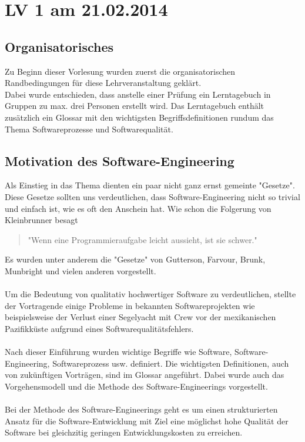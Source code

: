 \chapter{LV 1 am 21.02.2014}
\section{Organisatorisches}
Zu Beginn dieser Vorlesung wurden zuerst die organisatorischen Randbedingungen für diese Lehrveranstaltung geklärt.\\
Dabei wurde entschieden, dass anstelle einer Prüfung ein Lerntagebuch in Gruppen zu max. drei Personen erstellt wird. Das Lerntagebuch enthält zusätzlich ein Glossar mit den wichtigsten Begriffsdefinitionen rundum das Thema Softwareprozesse und Softwarequalität.

\section{Motivation des Software-Engineering}
Als Einstieg in das Thema dienten ein paar nicht ganz ernst gemeinte "Gesetze". Diese Gesetze sollten uns verdeutlichen, dass Software-Engineering nicht so trivial und einfach ist, wie es oft den Anschein hat. Wie schon die Folgerung von Kleinbrunner besagt
\begin{quote}
"Wenn eine Programmieraufgabe leicht aussieht, ist sie schwer."
\end{quote}
Es wurden unter anderem die "Gesetze" von Gutterson, Farvour, Brunk, Munbright und vielen anderen vorgestellt.
\\\\
Um die Bedeutung von qualitativ hochwertiger Software zu verdeutlichen, stellte der Vortragende einige Probleme in bekannten Softwareprojekten wie beispielsweise der Verlust einer Segelyacht mit Crew vor der mexikanischen Pazifikküste aufgrund eines Softwarequalitätsfehlers.
\\\\
Nach dieser Einführung wurden wichtige Begriffe wie Software, Software-Engineering, Softwareprozess usw. definiert. Die wichtigsten Definitionen, auch von zukünftigen Vorträgen, sind im Glossar angeführt. Dabei wurde auch das Vorgehensmodell und die Methode des Software-Engineerings vorgestellt.
\\\\
Bei der Methode des Software-Engineerings geht es um einen strukturierten Ansatz für die Software-Entwicklung mit Ziel eine möglichst hohe Qualität der Software bei gleichzitig geringen Entwicklungskosten zu erreichen.
